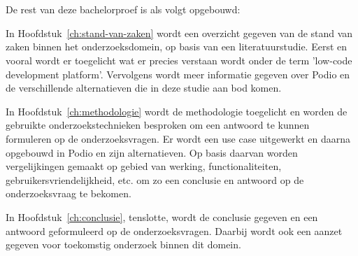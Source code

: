 \section{}%
\label{sec:opzet-bachelorproef} %


De rest van deze bachelorproef is als volgt opgebouwd:

In Hoofdstuk~\ref{ch:stand-van-zaken} wordt een overzicht gegeven van de stand van zaken binnen het onderzoeksdomein, op basis van een literatuurstudie. Eerst en vooral wordt er toegelicht wat er precies verstaan wordt onder de term 'low-code development platform'. Vervolgens wordt meer informatie gegeven over Podio en de verschillende alternatieven die in deze studie aan bod komen.

In Hoofdstuk~\ref{ch:methodologie} wordt de methodologie toegelicht en worden de gebruikte onderzoekstechnieken besproken om een antwoord te kunnen formuleren op de onderzoeksvragen. Er wordt een use case uitgewerkt en daarna opgebouwd in Podio en zijn alternatieven. Op basis daarvan worden vergelijkingen gemaakt op gebied van werking, functionaliteiten, gebruikersvriendelijkheid, etc. om zo een conclusie en antwoord op de onderzoeksvraag te bekomen.

In Hoofdstuk~\ref{ch:conclusie}, tenslotte, wordt de conclusie gegeven en een antwoord geformuleerd op de onderzoeksvragen. Daarbij wordt ook een aanzet gegeven voor toekomstig onderzoek binnen dit domein.